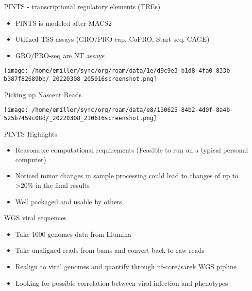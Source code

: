 \documentclass[bigger]{beamer}
\begin{document}
\begin{frame}[label={sec:orga77618f}]{PINTS - transcriptional regulatory elements (TREs)}
\begin{itemize}
\item PINTS is modeled after MACS2
\item Utilized TSS assays (GRO/PRO-\alert{cap}, CoPRO, Start-seq, CAGE)
\item GRO/PRO-\alert{seq} are NT assays
\end{itemize}


\begin{center}
\texttt{[image: /home/emiller/sync/org/roam/data/1e/d9c9e3-b1d8-4fa0-833b-b387f82689bb/\_20220308\_205916screenshot.png]}
\end{center}
\end{frame}


\begin{frame}[label={sec:org1924a03}]{Picking up Nascent Reads}
\begin{center}
\texttt{[image: /home/emiller/sync/org/roam/data/e8/130625-84b2-4d0f-8a4b-525b7459c08d/\_20220308\_210616screenshot.png]}
\end{center}
\end{frame}

\begin{frame}[label={sec:orge7dbc98}]{PINTS Highlights}
\begin{itemize}
\item Reasonable computational requirements (Feasible to run on a typical personal
computer)
\item Noticed \alert{minor changes} in sample processing could lead to changes of up to
\alert{>20\%} in the final results
\item Well packaged and usable by others
\end{itemize}
\end{frame}

\begin{frame}[label={sec:org07cd786}]{WGS viral sequences}
\begin{itemize}
\item Take 1000 genomes data from Illumina
\item Take unaligned reads from bams and convert back to raw reads
\item Realign to viral genomes and quantify through nf-core/sarek WGS pipline
\item Looking for possible correlation between viral infection and phenotypes
\end{itemize}
\end{frame}
\end{document}
